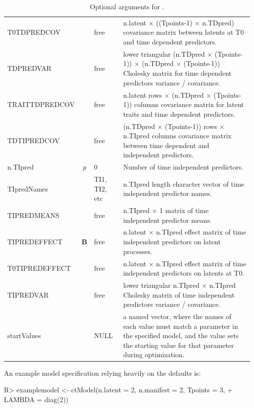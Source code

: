 \documentclass[nojss]{jss}\usepackage[]{graphicx}\usepackage[]{color}
\begin{document}
\begin{table}
\begin{tabular}{@{}l@{}|@{}c@{}|l@{}| p{8.6cm} }
T0TDPREDCOV & & free & n.latent $\times$ ((Tpoints-1) $\times$ n.TDpred) covariance matrix between latents at T0 and time dependent predictors.\\
TDPREDVAR & & free & lower triangular (n.TDpred $\times$ (Tpoints-1)) $\times$ (n.TDpred $\times$ (Tpoints-1)) Cholesky matrix for time dependent predictors variance / covariance.\\
TRAITTDPREDCOV & & free & n.latent rows $\times$ (n.TDpred $\times$ (Tpoints-1)) columns covariance matrix for latent traits and time dependent  predictors.\\
TDTIPREDCOV & & free & (n.TDpred $\times$ (Tpoints-1)) rows $\times$ n.TIpred columns covariance matrix between time dependent and independent predictors.\\
n.TIpred & \textit{p} & 0 & Number of time independent predictors.\\ 
TIpredNames & & TI1, TI2, etc & n.TIpred length character vector of time independent predictor names.\\
TIPREDMEANS & & free & n.TIpred $\times$ 1 matrix of time independent predictor means.\\
TIPREDEFFECT & $\textbf{B}$ & free & n.latent $\times$ n.TIpred effect matrix of time independent predictors on latent processes.\\
T0TIPREDEFFECT & & free & n.latent $\times$ n.TIpred effect matrix of time independent  predictors on latents at T0.\\
TIPREDVAR & & free & lower triangular n.TIpred $\times$ n.TIpred Cholesky matrix of time independent predictors variance / covariance.\\
startValues & & NULL & a named vector, where the names of each value must match a parameter in the specified model, and the value sets the starting value for that parameter during optimization.\\
\end{tabular}
\caption{\label{table:ctspecoptional}Optional arguments for .}
\end{table}
An example model specification relying heavily on the defaults is: 
\begin{Schunk}
\begin{Sinput}
R> examplemodel <- ctModel(n.latent = 2, n.manifest = 2, Tpoints = 3, 
+   LAMBDA = diag(2))
\end{Sinput}
\end{Schunk}
\end{document}
